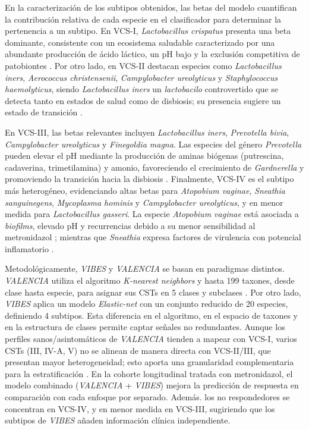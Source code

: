 En la caracterización de los subtipos obtenidos, las betas del modelo cuantifican la contribución relativa de cada especie en el clasificador para determinar la pertenencia a un subtipo. En VCS-I, \textit{Lactobacillus crispatus} presenta una beta dominante, consistente con un ecosistema saludable caracterizado por una abundante producción de ácido láctico, un pH bajo y la exclusión competitiva de patobiontes \cite{ravel2011vaginal, srinivasan2012bacterial}. Por otro lado, en VCS-II destacan especies como \textit{Lactobacillus iners}, \textit{Aerococcus christensenii}, \textit{Campylobacter ureolyticus} y \textit{Staphylococcus haemolyticus}, siendo \textit{Lactobacillus iners} un \textit{lactobacilo} controvertido que se detecta tanto en estados de salud como de disbiosis; su presencia sugiere un estado de transición \cite{macklaim2011crossroads, holm2023lactobacillus}.

En VCS-III, las betas relevantes incluyen \textit{Lactobacillus iners}, \textit{Prevotella bivia}, \textit{Campylobacter ureolyticus} y \textit{Finegoldia magna}. Las especies del género \textit{Prevotella} pueden elevar el pH mediante la producción de aminas biógenas (putrescina, cadaverina, trimetilamina) y amonio, favoreciendo el crecimiento de \textit{Gardnerella} y promoviendo la transición hacia la disbiosis \cite{miller2016lactobacilli, yeoman2013multi}. Finalmente, VCS-IV es el subtipo más heterogéneo, evidenciando altas betas para \textit{Atopobium vaginae}, \textit{Sneathia sanguinegens}, \textit{Mycoplasma hominis} y \textit{Campylobacter ureolyticus}, y en menor medida para \textit{Lactobacillus gasseri}. La especie \textit{Atopobium vaginae} está asociada a \textit{biofilms}, elevado pH y recurrencias debido a su menor sensibilidad al metronidazol \cite{swidsinski2008adherent, bradshaw2006association}; mientras que \textit{Sneathia} expresa factores de virulencia con potencial inflamatorio \cite{fredricks2005molecular, harwich2012genomic}.

Metodológicamente, \textit{VIBES} y \textit{VALENCIA} se basan en paradigmas distintos. \textit{VALENCIA} utiliza el algoritmo \textit{K-nearest neighbors} y hasta 199 taxones, desde clase hasta especie, para asignar sus CSTs en 5 clases y subclases \cite{france2020valencia}. Por otro lado, \textit{VIBES} aplica un modelo \textit{Elastic-net} con un conjunto reducido de 20 especies, definiendo 4 subtipos. Esta diferencia en el algoritmo, en el espacio de taxones y en la estructura de clases permite captar señales no redundantes. Aunque los perfiles sanos/asintomáticos de \textit{VALENCIA} tienden a mapear con VCS-I, varios CSTs (III, IV-A, V) no se alinean de manera directa con VCS-II/III, que presentan mayor heterogeneidad; esto aporta una granularidad complementaria para la estratificación \cite{ravel2011vaginal}. En la cohorte longitudinal tratada con metronidazol, el modelo combinado (\textit{VALENCIA} + \textit{VIBES}) mejora la predicción de respuesta en comparación con cada enfoque por separado. Además. los no respondedores se concentran en VCS-IV, y en menor medida en VCS-III, sugiriendo que los subtipos de \textit{VIBES} añaden información clínica independiente.

